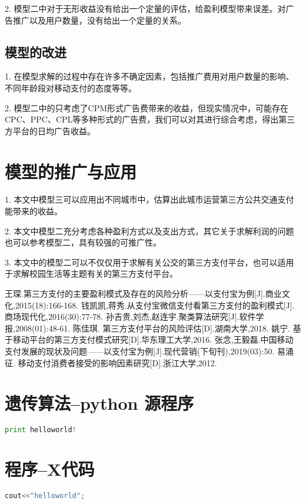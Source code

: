 \documentclass[withoutpreface,bwprint]{cumcmthesis} %
\begin{document}
2. 模型二中对于无形收益没有给出一个定量的评估，给盈利模型带来误差。对广告推广以及用户数量，没有给出一个定量的关系。
\subsection{模型的改进}
1. 在模型求解的过程中存在许多不确定因素，包括推广费用对用户数量的影响、不同年龄段对移动支付的态度等等。

2. 模型二中的只考虑了CPM形式广告费带来的收益，但现实情况中，可能存在CPC、PPC、CPL等多种形式的广告费，我们可以对其进行综合考虑，得出第三方平台的日均广告收益。
\section{模型的推广与应用}
1. 本文中模型三可以应用出不同城市中，估算出此城市运营第三方公共交通支付能带来的收益。

2. 本文中模型二充分考虑各种盈利方式以及支出方式，其它关于求解利润的问题也可以参考模型二，具有较强的可推广性。

3. 本文中的模型二可以不仅仅用于求解有关公交的第三方支付平台，也可以适用于求解校园生活等主题有关的第三方支付平台。



\begin{thebibliography}{9}%
  王琛.第三方支付的主要盈利模式及存在的风险分析——以支付宝为例[J].商业文化,2015(18):166-168.
 钱凯凯,蒋秀.从支付宝微信支付看第三方支付的盈利模式[J].商场现代化,2016(30):77-78.
 孙吉贵,刘杰,赵连宇.聚类算法研究[J].软件学报,2008(01):48-61.
 陈佳琪. 第三方支付平台的风险评估[D].湖南大学,2018.
 姚宁. 基于移动平台的第三方支付模式研究[D].华东理工大学,2016.
 张念,王毅磊.中国移动支付发展的现状及问题——以支付宝为例[J].现代营销(下旬刊),2019(03):50.
 易涌征. 移动支付消费者接受的影响因素研究[D].浙江大学,2012.
 
\end{thebibliography}

\newpage
\begin{appendices}
\section{遗传算法--python 源程序}
\begin{lstlisting}[language=python]
print helloworld!
 \end{lstlisting}
 \section{程序--X代码}
\begin{lstlisting}[language=c]
cout<<"helloworld";
 \end{lstlisting}
\end{appendices}
\end{document}
